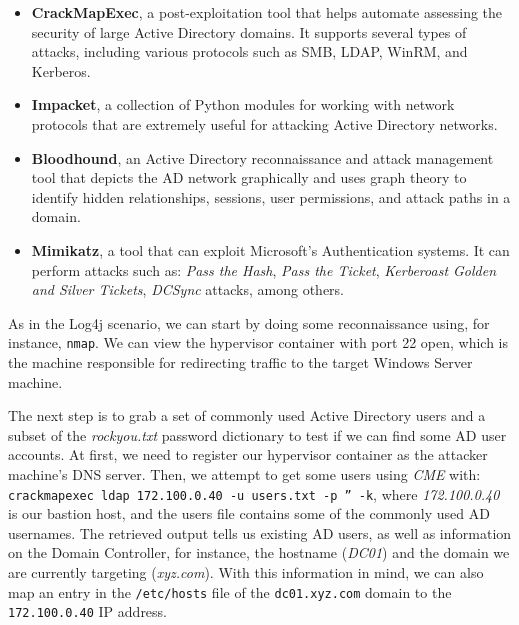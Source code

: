 \begin{itemize}
    \item \textbf{CrackMapExec}, a post-exploitation tool that helps automate assessing the security of large Active Directory domains. It supports several types of attacks, including various protocols such as SMB, LDAP, WinRM, and Kerberos.
    \item \textbf{Impacket}, a collection of Python modules for working with network protocols that are extremely useful for attacking Active Directory networks.
    \item \textbf{Bloodhound}, an Active Directory reconnaissance and attack management tool that depicts the AD network graphically and uses graph theory to identify hidden relationships, sessions, user permissions, and attack paths in a domain.
    \item \textbf{Mimikatz}, a tool that can exploit Microsoft's Authentication systems. It can perform attacks such as: \textit{Pass the Hash}, \textit{Pass the Ticket}, \textit{Kerberoast Golden and Silver Tickets}, \textit{DCSync} attacks, among others. 
\end{itemize}

As in the Log4j scenario, we can start by doing some reconnaissance using, for instance, \texttt{nmap}. We can view the hypervisor container with port 22 open, which is the machine responsible for redirecting traffic to the target Windows Server machine.

The next step is to grab a set of commonly used Active Directory users and a subset of the \textit{rockyou.txt} password dictionary to test if we can find some AD user accounts. At first, we need to register our hypervisor container as the attacker machine's DNS server. Then, we attempt to get some users using \textit{CME} with: \texttt{crackmapexec ldap 172.100.0.40 -u users.txt -p '' -k}, where \textit{172.100.0.40} is our bastion host, and the users file contains some of the commonly used AD usernames. The retrieved output tells us existing AD users, as well as information on the Domain Controller, for instance, the hostname (\textit{DC01}) and the domain we are currently targeting (\textit{xyz.com}). With this information in mind, we can also map an entry in the \texttt{/etc/hosts} file of the \texttt{dc01.xyz.com} domain to the \texttt{172.100.0.40} IP address.

